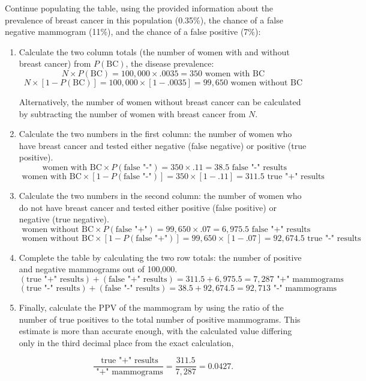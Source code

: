 Continue populating the table, using the provided information about the prevalence of breast cancer in this population (0.35\%), the chance of a false negative mammogram (11\%), and the chance of a false positive (7\%):

\begin{enumerate}
	\item Calculate the two column totals (the number of women with and without breast cancer) from $P(\text{BC})$, the disease prevalence:
	\[N \times P(\text{BC}) = 100,000 \times .0035 = 350 \text{ women with BC}\]
	\[N \times [1 - P(\text{BC})] = 100,000 \times [1 - .0035] = 99,650 \text{ women without BC}\]
	
	Alternatively, the number of women without breast cancer can be calculated by subtracting the number of women with breast cancer from $N$.
	
	\item Calculate the two numbers in the first column: the number of women who have breast cancer and tested either negative (false negative) or positive (true positive).
	\[\text{ women with BC} \times P(\text{false "-"}) = 350 \times .11 = 38.5 \text{ false "-" results}\]
	\[\text{ women with BC} \times [1 - P(\text{false "-"})] = 350 \times [1 - .11] = 311.5 \text{ true "+" results}\]
	
	\item Calculate the two numbers in the second column: the number of women who do not have breast cancer and tested either positive (false positive) or negative (true negative). 
	\[\text{ women without BC} \times P(\text{false "+"}) = 99,650 \times .07 = 6,975.5 \text{ false "+" results}\]
	\[\text{ women without BC} \times [1 - P(\text{false "+"})] = 99,650 \times [1 - .07] = 92,674.5 \text{ true "-" results}\]
	
	\item Complete the table by calculating the two row totals: the number of positive and negative mammograms out of 100,000.
	\[(\text{true "+" results}) + (\text{false "+" results}) = 311.5 + 6,975.5 = 7,287 \text{ "+" mammograms}\]
	\[(\text{true "-" results}) + (\text{false "-" results}) = 38.5 + 92,674.5 = 92,713 \text{ "-" mammograms}\]
	
	\item Finally, calculate the PPV of the mammogram by using the ratio of the number of true positives to the total number of positive mammograms. This estimate is more than accurate enough, with the calculated value differing only in the third decimal place from the exact calculation, 
	
	\[\dfrac{\text{ true "+" results}}{\text{ "+" mammograms}} = \dfrac{311.5}{7,287} = 0.0427. \]
	
\end{enumerate}

